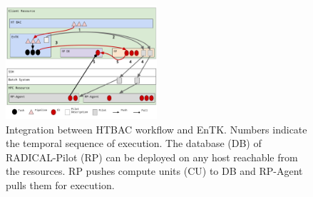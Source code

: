 \begin{figure}
\centering
  \includegraphics[width=0.5\textwidth]{FIGURES/ht-bac-rp_integration.pdf}
  \caption{Integration between HTBAC workflow and EnTK\@. Numbers indicate
  the temporal sequence of execution. The database (DB) of RADICAL-Pilot (RP)
  can be deployed on any host reachable from the resources. RP pushes compute
  units (CU) to DB and RP-Agent pulls them for execution. }\label{figure:ht-bac_rp}
\end{figure}


